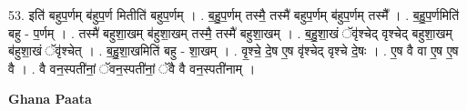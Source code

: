 \documentclass[17pt]{extarticle}
\begin{document}
53. इति॑ बहुप॒र्णम् ब॑हुप॒र्ण मितीति॑ बहुप॒र्णम् । . ब॒हु॒प॒र्णम् तस्मै॒ तस्मै॑ बहुप॒र्णम् ब॑हुप॒र्णम् तस्मै᳚ । . ब॒हु॒प॒र्णमिति॑ बहु - प॒र्णम् । . तस्मै॑ बहुशा॒खम् ब॑हुशा॒खम् तस्मै॒ तस्मै॑ बहुशा॒खम् । . ब॒हु॒शा॒खं ॅवृ॑श्चेद् वृश्चेद् बहुशा॒खम् ब॑हुशा॒खं ॅवृ॑श्चेत् । . ब॒हु॒शा॒खमिति॑ बहु - शा॒खम् । . वृ॒श्चे॒ दे॒ष ए॒ष वृ॑श्चेद् वृश्चे दे॒षः । . ए॒ष वै वा ए॒ष ए॒ष वै । . वै वन॒स्पती॑नां॒ ॅवन॒स्पती॑नां॒ ॅवै वै वन॒स्पती॑नाम् । \newline

\textbf{Ghana Paata } \newline
\end{document}
